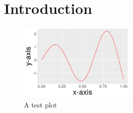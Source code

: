 \chapter{Introduction}

\begin{figure}
    \centering
    \includegraphics[width = 0.5\textwidth]{fig/test_plot.png}
    \caption{A test plot}
    \label{fig:test}
\end{figure}